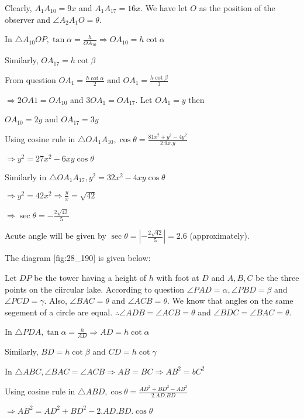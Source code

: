   Clearly, $A_1A_{10} = 9x$ and $A_1A_{17} = 16x$. We have let $O$ as the position of
  the observer and $\angle A_2A_1O = \theta$.

  In $\triangle A_{10}OP, \tan\alpha = \frac{h}{OA_{10}}\Rightarrow OA_{10} = h\cot\alpha$

  Similarly, $OA_{17} = h\cot\beta$

  From question $OA_1 = \frac{h\cot\alpha}{2}$ and $OA_1 = \frac{h\cot\beta}{3}$

  $\Rightarrow 2OA1 = OA_{10}$ and $3OA_1 = OA_{17}$. Let $OA_1 = y$ then

  $OA_{10} = 2y$ and $OA_{17} = 3y$

  Using cosine rule in $\triangle OA_1A_{10}, \cos\theta = \frac{81x^2 + y^2 - 4y^2}{2.9x.y}$

  $\Rightarrow y^2 = 27x^2 - 6xy\cos\theta$

  Similarly in $\triangle OA_1A_{17}, y^2 = 32x^2 - 4xy\cos\theta$

  $\Rightarrow y^2 = 42x^2 \Rightarrow \frac{y}{x} = \sqrt{42}$

  $\Rightarrow \sec\theta = -\frac{2\sqrt{42}}{5}$

  Acute angle will be given by $\sec\theta = \left|-\frac{2\sqrt{42}}{5}\right| = 2.6$ (approximately).

\item The diagram [fig:28_190] is given below:

  \startplacefigure[reference=fig:28_190]
    \externalfigure[28_190.pdf]
  \stopplacefigure

  Let $DP$ be the tower having a height of $h$ with foot at $D$ and $A, B, C$ be
  the three points on the ciircular lake. According to question $\angle PAD = \alpha, \angle PBD =
  \beta$ and $\angle PCD = \gamma$. Also, $\angle BAC = \theta$ and $\angle ACB =
  \theta$. We know that angles on the same segement of a circle are equal. $\therefore \angle ADB =
  \angle ACB = \theta$ and $\angle BDC = \angle BAC = \theta$.

  In $\triangle PDA, \tan\alpha = \frac{h}{AD} \Rightarrow AD = h\cot\alpha$

  Similarly, $BD = h\cot\beta$ and $CD = h\cot\gamma$

  In $\triangle ABC, \angle BAC = \angle ACB \Rightarrow AB = BC \Rightarrow AB^2 = bC^2$

  Using cosine rule in $\triangle ABD, \cos\theta = \frac{AD^2 + BD^2 - AB^2}{2.AD.BD}$

  $\Rightarrow AB^2 = AD^2 + BD^2 - 2.AD.BD.\cos\theta$

